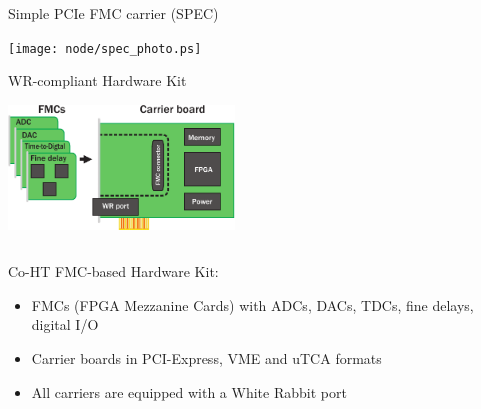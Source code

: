 \documentclass[compress,red]{beamer}
\begin{document}
\begin{frame}{Simple PCIe FMC carrier (SPEC)}

    \begin{center}
    \texttt{[image: node/spec\_photo.ps]}
    \end{center}


\end{frame}
\begin{frame}{WR-compliant Hardware Kit}

    \begin{center}
    \includegraphics[width=6cm]{node/shw_kit}
    \end{center}

  \begin{columns}[c]

	\begin{block}{Co-HT FMC-based Hardware Kit:}
	  \begin{itemize}
	  \item FMCs (FPGA Mezzanine Cards) with ADCs, DACs, TDCs, fine delays, digital I/O
	  \item Carrier boards in PCI-Express, VME and uTCA formats
	  \item All carriers are equipped with a White Rabbit port
	  \end{itemize}
	\end{block}

  \end{columns}


\end{frame}
\end{document}
